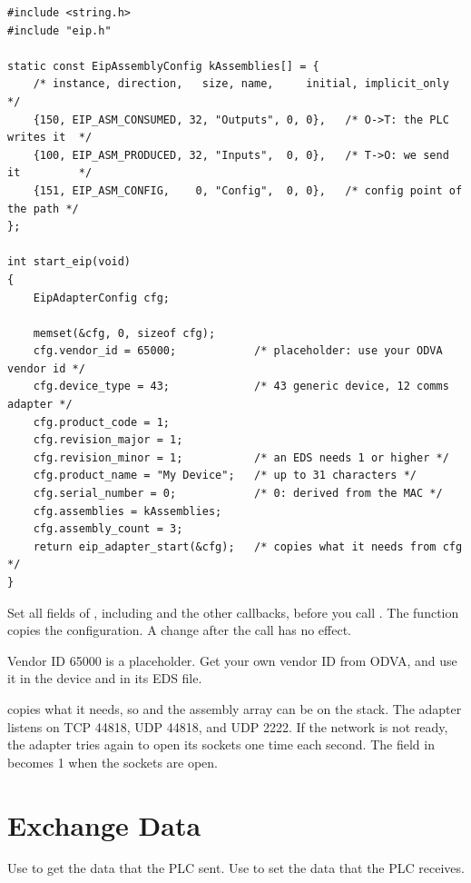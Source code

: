 \begin{lstlisting}
#include <string.h>
#include "eip.h"

static const EipAssemblyConfig kAssemblies[] = {
    /* instance, direction,   size, name,     initial, implicit_only */
    {150, EIP_ASM_CONSUMED, 32, "Outputs", 0, 0},   /* O->T: the PLC writes it  */
    {100, EIP_ASM_PRODUCED, 32, "Inputs",  0, 0},   /* T->O: we send it         */
    {151, EIP_ASM_CONFIG,    0, "Config",  0, 0},   /* config point of the path */
};

int start_eip(void)
{
    EipAdapterConfig cfg;

    memset(&cfg, 0, sizeof cfg);
    cfg.vendor_id = 65000;            /* placeholder: use your ODVA vendor id */
    cfg.device_type = 43;             /* 43 generic device, 12 comms adapter */
    cfg.product_code = 1;
    cfg.revision_major = 1;
    cfg.revision_minor = 1;           /* an EDS needs 1 or higher */
    cfg.product_name = "My Device";   /* up to 31 characters */
    cfg.serial_number = 0;            /* 0: derived from the MAC */
    cfg.assemblies = kAssemblies;
    cfg.assembly_count = 3;
    return eip_adapter_start(&cfg);   /* copies what it needs from cfg */
}
\end{lstlisting}

\begin{caution}
Set all fields of , including  and the
other callbacks, before you call . The function copies
the configuration. A change after the call has no effect.
\end{caution}

\begin{note}
\notelabel Vendor ID 65000 is a placeholder. Get your own vendor ID from
ODVA, and use it in the device and in its EDS file.
\end{note}

 copies what it needs, so  and the assembly
array can be on the stack. The adapter listens on TCP 44818, UDP 44818, and
UDP 2222. If the network is not ready, the adapter tries again to open its
sockets one time each second. The field  in
 becomes 1 when the sockets are open.

\section{Exchange Data}\label{sec:exchange}

Use  to get the data that the PLC sent. Use
 to set the data that the PLC receives.

